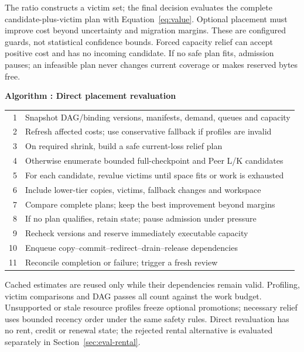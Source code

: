 The ratio constructs a victim set; the final decision evaluates the
complete candidate-plus-victim plan with Equation~\ref{eq:value}.
Optional placement must improve cost beyond uncertainty and migration
margins. These are configured guards, not statistical confidence bounds.
Forced capacity relief can accept positive cost and has no incoming
candidate. If no safe plan fits, admission pauses; an infeasible plan
never changes current coverage or makes reserved bytes free.

\par\medskip\noindent\begin{minipage}{\columnwidth}
\raggedright
 \label{alg:placement}
 \textbf{Algorithm \thedesignalgorithm: Direct placement revaluation}
 \par\smallskip
 \begin{tabularx}{\columnwidth}{@{}r@{\quad}X@{}}
 \toprule
 1 & Snapshot DAG/binding versions, manifests, demand, queues and capacity \\
 2 & Refresh affected costs; use conservative fallback if profiles are invalid \\
 3 & On required shrink, build a safe current-loss relief plan \\
 4 & Otherwise enumerate bounded full-checkpoint and Peer L/K candidates \\
 5 & For each candidate, revalue victims until space fits or work is exhausted \\
 6 & Include lower-tier copies, victims, fallback changes and workspace \\
 7 & Compare complete plans; keep the best improvement beyond margins \\
 8 & If no plan qualifies, retain state; pause admission under pressure \\
 9 & Recheck versions and reserve immediately executable capacity \\
 10 & Enqueue copy--commit--redirect--drain--release dependencies \\
 11 & Reconcile completion or failure; trigger a fresh review \\
 \bottomrule
 \end{tabularx}
\end{minipage}\par\medskip

Cached estimates are reused only while their dependencies remain valid.
Profiling, victim comparisons and DAG passes all count against the work
budget. Unsupported or stale resource profiles freeze optional promotions;
necessary relief uses bounded recency order under the same safety rules.
Direct revaluation has no rent, credit or renewal state; the rejected
rental alternative is evaluated separately in Section~\ref{sec:eval-rental}.

